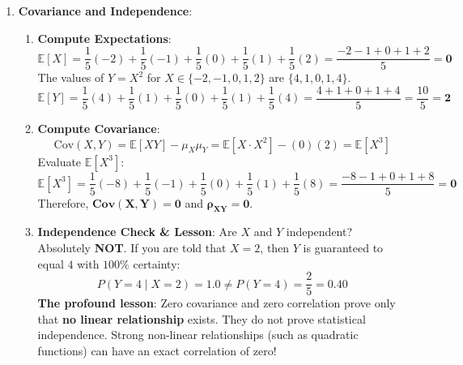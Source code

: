 \begin{enumerate}
    \item \textbf{Covariance and Independence}:
    \begin{enumerate}[label=(\alph*)]
        \item \textbf{Compute Expectations}:
        \begin{equation*}
        \mathbb{E}[X] = \frac{1}{5}(-2) + \frac{1}{5}(-1) + \frac{1}{5}(0) + \frac{1}{5}(1) + \frac{1}{5}(2) = \frac{-2 - 1 + 0 + 1 + 2}{5} = \mathbf{0}
        \end{equation*}
        The values of $Y = X^2$ for $X \in \{-2, -1, 0, 1, 2\}$ are $\{4, 1, 0, 1, 4\}$.
        \begin{equation*}
        \mathbb{E}[Y] = \frac{1}{5}(4) + \frac{1}{5}(1) + \frac{1}{5}(0) + \frac{1}{5}(1) + \frac{1}{5}(4) = \frac{4 + 1 + 0 + 1 + 4}{5} = \frac{10}{5} = \mathbf{2}
        \end{equation*}
        \item \textbf{Compute Covariance}:
        \begin{equation*}
        \text{Cov}(X, Y) = \mathbb{E}[XY] - \mu_X \mu_Y = \mathbb{E}[X \cdot X^2] - (0)(2) = \mathbb{E}[X^3]
        \end{equation*}
        Evaluate $\mathbb{E}[X^3]$:
        \begin{equation*}
        \mathbb{E}[X^3] = \frac{1}{5}(-8) + \frac{1}{5}(-1) + \frac{1}{5}(0) + \frac{1}{5}(1) + \frac{1}{5}(8) = \frac{-8 - 1 + 0 + 1 + 8}{5} = \mathbf{0}
        \end{equation*}
        Therefore, $\mathbf{\text{Cov}(X, Y) = 0}$ and $\mathbf{\rho_{XY} = 0}$.
        \item \textbf{Independence Check \& Lesson}:
        Are $X$ and $Y$ independent? Absolutely \textbf{NOT}. If you are told that $X = 2$, then $Y$ is guaranteed to equal $4$ with $100\%$ certainty:
        \begin{equation*}
        P(Y = 4 \mid X = 2) = 1.0 \ne P(Y = 4) = \frac{2}{5} = 0.40
        \end{equation*}
        \textbf{The profound lesson}: Zero covariance and zero correlation prove only that \textbf{no linear relationship} exists. They do not prove statistical independence. Strong non-linear relationships (such as quadratic functions) can have an exact correlation of zero!
    \end{enumerate}


\end{enumerate}
